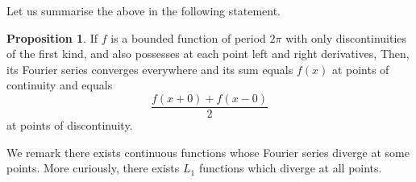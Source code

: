 \documentclass[]{article}
\theoremstyle{definition}
\theoremstyle{definition}
\newtheorem{proposition}{Proposition}[section]
\begin{document}
Let us summarise the above in the following statement.

\begin{proposition}
  If \(f\) is a bounded function of period \(2\pi\) with only 
  discontinuities of the first kind, and also possesses at each point left and right 
  derivatives, Then, its Fourier series converges everywhere and its sum equals 
  \(f(x)\) at points of continuity and equals 
  \[\frac{f(x + 0) + f(x - 0)}{2}\]
  at points of discontinuity.
\end{proposition}

We remark there exists continuous functions whose Fourier series diverge at some 
points. More curiously, there exists \(L_1\) functions which diverge at all points.
\end{document}
